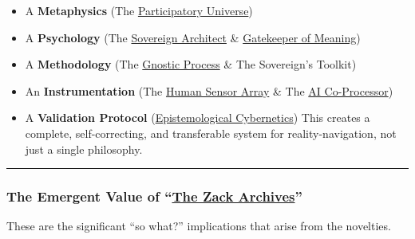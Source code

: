 \documentclass{article}
\begin{document}
\begin{enumerate}
  \begin{itemize}
  \item
    A \textbf{Metaphysics} (The \hyperlink{gloss:participatory_universe}{Participatory Universe})
  \item
    A \textbf{Psychology} (The \hyperlink{gloss:sovereign_architect}{Sovereign Architect} \& \hyperlink{gloss:gatekeeper_of_meaning}{Gatekeeper of Meaning})
  \item
    A \textbf{Methodology} (The \hyperlink{gloss:gnostic_process}{Gnostic Process} \& The Sovereign's Toolkit)
  \item
    An \textbf{Instrumentation} (The \hyperlink{gloss:human_sensor_array}{Human Sensor Array} \& The \hyperlink{gloss:ai_co_processor}{AI Co-Processor})
  \item
    A \textbf{Validation Protocol} (\hyperlink{gloss:epistemological_cybernetics}{Epistemological Cybernetics}) This creates a complete, self-correcting, and transferable system for reality-navigation, not just a single philosophy.
  \end{itemize}
\end{enumerate}

\begin{center}\rule{0.5\linewidth}{0.5pt}\end{center}

\subsubsection*{The Emergent Value of ``\hyperlink{gloss:the_zack_archives}{The Zack Archives}''}\label{the-emergent-value-of-the-zack-archives}

These are the significant ``so what?'' implications that arise from the novelties.
\end{document}
